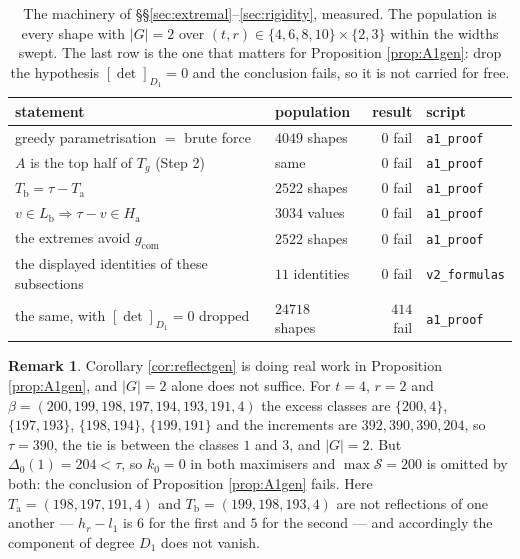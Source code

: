 \documentclass[11pt,reqno]{amsart}
\theoremstyle{plain}
\theoremstyle{definition}
\newtheorem{remark}[theorem]{Remark}
\begin{document}
\begin{table}[!ht]
\centering\small
\caption{The machinery of \S\S\ref{sec:extremal}--\ref{sec:rigidity}, measured. The population is
every shape with $|G|=2$ over $(t,r)\in\{4,6,8,10\}\times\{2,3\}$ within the widths swept. The last
row is the one that matters for Proposition \ref{prop:A1gen}: drop the hypothesis
$[\det]_{D_1}=0$ and the conclusion fails, so it is not carried for free.}
\label{tab:extremal}
\begin{tabular}{@{}llrl@{}}
\toprule
statement & population & result & script \\
\midrule
\rowcolor{hband} greedy parametrisation $=$ brute force & $4049$ shapes & \textcolor{hproved}{$0$ fail} & \texttt{a1\_proof} \\
$A$ is the top half of $T_g$ (Step 2) & same & \textcolor{hproved}{$0$ fail} & \texttt{a1\_proof} \\
\rowcolor{hband} $T_{\mathrm b}=\tau-T_{\mathrm a}$ & $2522$ shapes & \textcolor{hproved}{$0$ fail} & \texttt{a1\_proof} \\
$v\in L_{\mathrm b}\Rightarrow\tau-v\in H_{\mathrm a}$ & $3034$ values & \textcolor{hproved}{$0$ fail} & \texttt{a1\_proof} \\
\rowcolor{hband} the extremes avoid $g_{\mathrm{com}}$ & $2522$ shapes & \textcolor{hproved}{$0$ fail} & \texttt{a1\_proof} \\
the displayed identities of these subsections & $11$ identities & \textcolor{hproved}{$0$ fail} & \texttt{v2\_formulas} \\
\midrule
\rowcolor{hband} the same, with $[\det]_{D_1}=0$ dropped & $24718$ shapes & \textcolor{hverif}{$414$ fail} & \texttt{a1\_proof} \\
\bottomrule
\end{tabular}
\end{table}

\begin{remark}
Corollary \ref{cor:reflectgen} is doing real work in Proposition \ref{prop:A1gen}, and $|G|=2$ alone
does not suffice. For $t=4$, $r=2$ and $\beta=(200,199,198,197,194,193,191,4)$ the excess classes are
$\{200,4\}$, $\{197,193\}$, $\{198,194\}$, $\{199,191\}$ and the increments are $392,390,390,204$, so
$\tau=390$, the tie is between the classes $1$ and $3$, and $|G|=2$. But $\Delta_0(1)=204<\tau$, so
$k_0=0$ in both maximisers and $\max\mathcal{S}=200$ is omitted by both: the conclusion of Proposition
\ref{prop:A1gen} fails. Here $T_{\mathrm a}=(198,197,191,4)$ and $T_{\mathrm b}=(199,198,193,4)$ are
not reflections of one another --- $h_r-l_1$ is $6$ for the first and $5$ for the second --- and
accordingly the component of degree $D_1$ does not vanish.
\end{remark}
\end{document}
